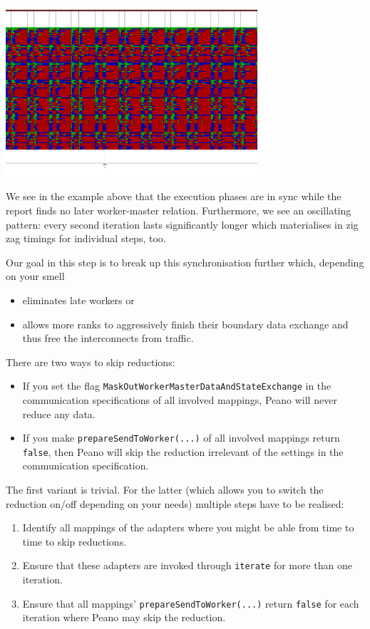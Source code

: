 \begin{center}
  \includegraphics[width=0.7\textwidth]{63_mpi-synchronisation/no-skip-of-reduction.png}
\end{center}

\noindent
We see in the example above that the execution phases are in sync while the
report finds no later worker-master relation. 
Furthermore, we see an oscillating pattern: every second iteration lasts
significantly longer which materialises in zig zag timings for individual steps,
too.

Our goal in this step is to break up this synchronisation further which,
depending on your smell
\begin{itemize}
  \item eliminates late workers or
  \item allows more ranks to aggressively finish their boundary data exchange
  and thus free the interconnects from traffic.
\end{itemize}


\noindent
There are two ways to skip reductions:
\begin{itemize}
  \item If you set the flag \texttt{MaskOutWorkerMasterDataAndStateExchange}
  in the communication specifications of all involved mappings, Peano will never
  reduce any data.
  \item If you make \texttt{prepareSendToWorker(...)} of all involved mappings
  return \texttt{false}, then Peano will skip the reduction irrelevant of the
  settings in the communication specification.
\end{itemize}


\noindent
The first variant is trivial. For the latter (which allows you to switch the
reduction on/off depending on your needs) multiple steps have to be realised:


\begin{enumerate}
  \item Identify all mappings of the adapters where you might be able from time
  to time to skip reductions.
  \item Ensure that these adapters are invoked through \texttt{iterate} for more
  than one iteration.
  \item Ensure that all mappings' \texttt{prepareSendToWorker(...)} return
  \texttt{false} for each iteration where Peano may skip the reduction.
\end{enumerate}

